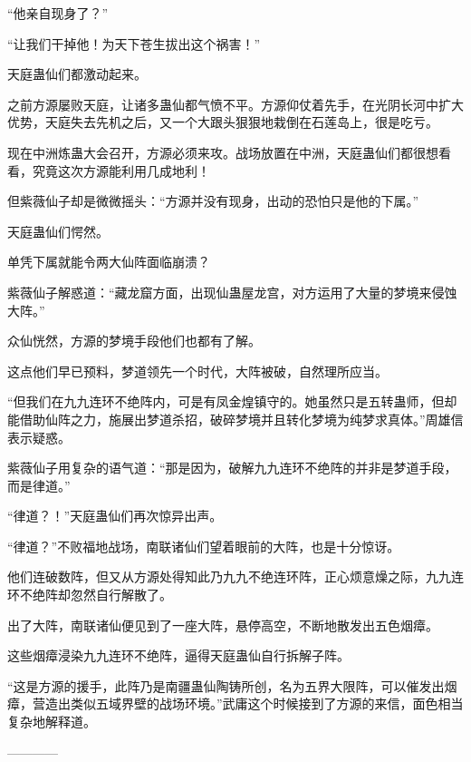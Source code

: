 \begin{this_body}
“他亲自现身了？”

“让我们干掉他！为天下苍生拔出这个祸害！”

天庭蛊仙们都激动起来。

之前方源屡败天庭，让诸多蛊仙都气愤不平。方源仰仗着先手，在光阴长河中扩大优势，天庭失去先机之后，又一个大跟头狠狠地栽倒在石莲岛上，很是吃亏。

现在中洲炼蛊大会召开，方源必须来攻。战场放置在中洲，天庭蛊仙们都很想看看，究竟这次方源能利用几成地利！

但紫薇仙子却是微微摇头：“方源并没有现身，出动的恐怕只是他的下属。”

天庭蛊仙们愕然。

单凭下属就能令两大仙阵面临崩溃？

紫薇仙子解惑道：“藏龙窟方面，出现仙蛊屋龙宫，对方运用了大量的梦境来侵蚀大阵。”

众仙恍然，方源的梦境手段他们也都有了解。

这点他们早已预料，梦道领先一个时代，大阵被破，自然理所应当。

“但我们在九九连环不绝阵内，可是有凤金煌镇守的。她虽然只是五转蛊师，但却能借助仙阵之力，施展出梦道杀招，破碎梦境并且转化梦境为纯梦求真体。”周雄信表示疑惑。

紫薇仙子用复杂的语气道：“那是因为，破解九九连环不绝阵的并非是梦道手段，而是律道。”

“律道？！”天庭蛊仙们再次惊异出声。

“律道？”不败福地战场，南联诸仙们望着眼前的大阵，也是十分惊讶。

他们连破数阵，但又从方源处得知此乃九九不绝连环阵，正心烦意燥之际，九九连环不绝阵却忽然自行解散了。

出了大阵，南联诸仙便见到了一座大阵，悬停高空，不断地散发出五色烟瘴。

这些烟瘴浸染九九连环不绝阵，逼得天庭蛊仙自行拆解子阵。

“这是方源的援手，此阵乃是南疆蛊仙陶铸所创，名为五界大限阵，可以催发出烟瘴，营造出类似五域界壁的战场环境。”武庸这个时候接到了方源的来信，面色相当复杂地解释道。

------------

\end{this_body}

